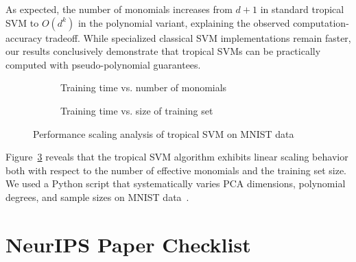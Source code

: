 \documentclass{article}
\begin{document}
As expected, the number of monomials increases from $d+1$ in standard tropical SVM to $O(d^k)$ in the polynomial variant, explaining the observed computation-accuracy tradeoff. While specialized classical SVM implementations remain faster, our results conclusively demonstrate that tropical SVMs can be practically computed with pseudo-polynomial guarantees.

\begin{figure}[htbp]
    \centering
    \begin{subfigure}{0.48\textwidth}
        \centering
        \resizebox{0.95\textwidth}{!}{}
        \caption{Training time vs. number of monomials}
        \label{fig:pca_degree_scaling}
    \end{subfigure}
    \hfill
    \begin{subfigure}{0.48\textwidth}
        \centering
        \resizebox{0.95\textwidth}{!}{}
        \caption{Training time vs. size of training set}
        \label{fig:sample_size_scaling}
    \end{subfigure}
    \caption{Performance scaling analysis of tropical SVM on MNIST data}
    \label{fig:scaling_analysis}
\end{figure}

Figure~\ref{fig:scaling_analysis} reveals that the tropical SVM algorithm exhibits linear scaling behavior both with respect to the number of effective monomials and the training set size. We used a Python script that systematically varies PCA dimensions, polynomial degrees, and sample sizes on MNIST data \cite{MNIST}.


\newpage
\section*{NeurIPS Paper Checklist}
\end{document}
